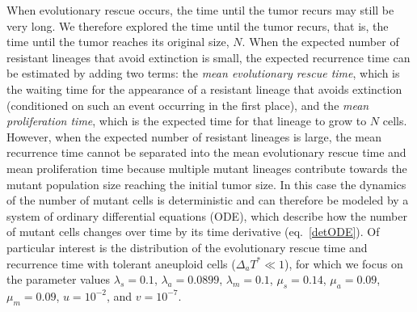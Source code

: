 \documentclass[12pt]{extarticle}
\begin{document}
When evolutionary rescue occurs, the time until the tumor recurs may still be very long. We therefore explored the time until the tumor recurs, that is, the time until the tumor reaches its original size, $N$.
When the expected number of resistant lineages that avoid extinction is small, the expected recurrence time can be estimated by adding two terms: the \emph{mean evolutionary rescue time}, which is the waiting time for the appearance of a resistant lineage that avoids extinction (conditioned on such an event occurring in the first place), and the \emph{mean proliferation time}, which is the expected time for that lineage to grow to $N$ cells.
However, when the expected number of resistant lineages is large, the mean recurrence time cannot be separated into the mean evolutionary rescue time and mean proliferation time because multiple mutant lineages contribute towards the mutant population size reaching the initial tumor size.
In this case the dynamics of the number of mutant cells is deterministic and can therefore be modeled by a system of ordinary differential equations (ODE), which describe how the number of mutant cells changes over time by its time derivative (eq.~\ref{detODE}). %
Of particular interest is the distribution of the evolutionary rescue time and recurrence time with tolerant aneuploid cells ($\Delta_a T^*\ll1$), for which we focus on the parameter values $\lambda_s=0.1$, $\lambda_a=0.0899$, $\lambda_m=0.1$, $\mu_s=0.14$, $\mu_a=0.09$, $\mu_m=0.09$, $u=10^{-2}$, and $v=10^{-7}$.
\end{document}
